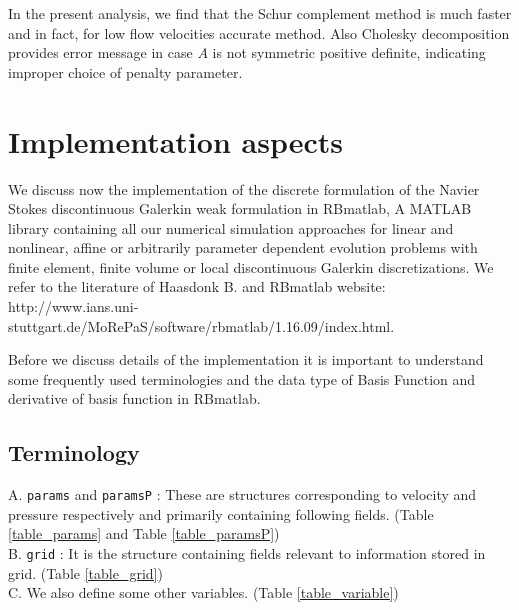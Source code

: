 \documentclass[a4paper,openany]{book}
\begin{document}
In the present analysis, we find that the Schur complement method is much faster and in fact, for low flow velocities accurate method. Also Cholesky decomposition provides error message in case $A$ is not symmetric positive definite, indicating improper choice of penalty parameter. 

\chapter{Implementation aspects} \label{implementation_aspects}

We discuss now the implementation of the discrete formulation of the Navier Stokes discontinuous Galerkin weak formulation in RBmatlab, A MATLAB library containing all our numerical simulation approaches for linear and nonlinear, affine or arbitrarily parameter dependent evolution problems with finite element, finite volume or local discontinuous Galerkin discretizations. We refer to the literature of Haasdonk B.\cite{Haasdonk_book} and RBmatlab website: \\
http://www.ians.uni-stuttgart.de/MoRePaS/software/rbmatlab/1.16.09/\linebreak index.html.  

Before we discuss details of the implementation it is important to understand some frequently used terminologies and the data type of Basis Function and derivative of basis function in RBmatlab.

\section{Terminology}

A. \verb|params| and \verb|paramsP| : These are structures corresponding to velocity and pressure respectively and primarily containing following fields. (Table \ref{table_params} and Table \ref{table_paramsP})\\

B. \verb|grid| : It is the structure containing fields relevant to information stored in grid. (Table \ref{table_grid})\\

C. We also define some other variables. (Table \ref{table_variable})\\
\end{document}

